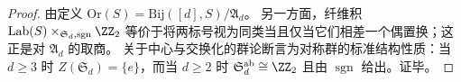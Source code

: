 \begin{proof}
由定义 \(\mathrm{Or}(S)=\mathrm{Bij}([d],S)/\mathfrak{A}_d\)。
另一方面，纤维积 \(\mathrm{Lab}(S)\times_{\mathfrak{S}_d,\operatorname{sgn}}\ZZ_2\) 等价于将两标号视为同类当且仅当它们相差一个偶置换；这正是对 \(\mathfrak{A}_d\) 的取商。
关于中心与交换化的群论断言为对称群的标准结构性质：当 \(d\ge 3\) 时 \(Z(\mathfrak{S}_d)=\{e\}\)，而当 \(d\ge 2\) 时 \(\mathfrak{S}_d^{\mathrm{ab}}\cong\ZZ_2\) 且由 \(\operatorname{sgn}\) 给出。证毕。
\end{proof}

